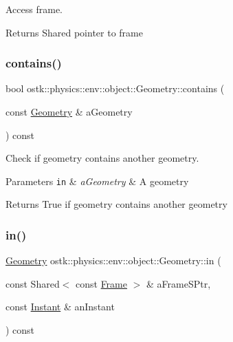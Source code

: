 Access frame. 

\begin{DoxyReturn}{Returns}
Shared pointer to frame 
\end{DoxyReturn}
\mbox{\label{classostk_1_1physics_1_1env_1_1object_1_1_geometry_ab08322d5d7639f1e22c0d6c2999c7e28}} 
\subsubsection{\texorpdfstring{contains()}{contains()}}
{\footnotesize\ttfamily bool ostk\+::physics\+::env\+::object\+::\+Geometry\+::contains (\begin{DoxyParamCaption}\item[{const \hyperlink{classostk_1_1physics_1_1env_1_1object_1_1_geometry}{Geometry} \&}]{a\+Geometry }\end{DoxyParamCaption}) const}



Check if geometry contains another geometry. 


\begin{DoxyParams}[1]{Parameters}
\mbox{\tt in}  & {\em a\+Geometry} & A geometry \\
\hline
\end{DoxyParams}
\begin{DoxyReturn}{Returns}
True if geometry contains another geometry 
\end{DoxyReturn}
\mbox{\label{classostk_1_1physics_1_1env_1_1object_1_1_geometry_ac9d7aa217eb0ec8d0dff7270ca2d0447}} 
\subsubsection{\texorpdfstring{in()}{in()}}
{\footnotesize\ttfamily \hyperlink{classostk_1_1physics_1_1env_1_1object_1_1_geometry}{Geometry} ostk\+::physics\+::env\+::object\+::\+Geometry\+::in (\begin{DoxyParamCaption}\item[{const Shared$<$ const \hyperlink{classostk_1_1physics_1_1coord_1_1_frame}{Frame} $>$ \&}]{a\+Frame\+S\+Ptr,  }\item[{const \hyperlink{classostk_1_1physics_1_1time_1_1_instant}{Instant} \&}]{an\+Instant }\end{DoxyParamCaption}) const}



